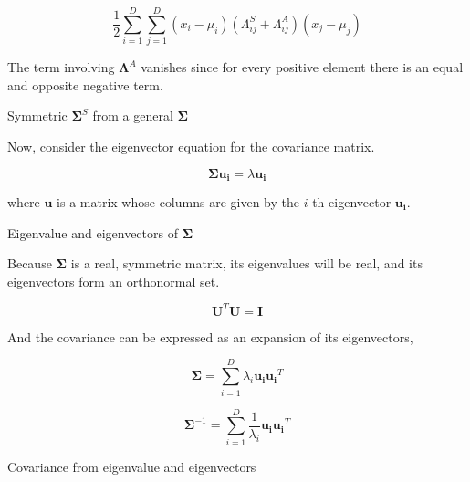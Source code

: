 \begin{equation}
\frac{1}{2} \sum_{i=1}^D \sum_{j=1}^D (x_i - \mu_i) (\Lambda_{ij}^S + \Lambda_{ij}^A)(x_j - \mu_j)
\end{equation}

The term involving $\bm{\Lambda}^A$ vanishes since for every positive element there is an equal and opposite negative term.

\begin{algorithm}  
  \caption{Symmetric $\bm{\Sigma}^S$ from a general $\bm{\Sigma}$}
  \label{alg:symmetricSigma}
  
\end{algorithm}

Now, consider the eigenvector equation for the covariance matrix.

\begin{equation}
 \bm{\Sigma}\mathbf{u_i} = \lambda \mathbf{u_i}
\end{equation}

where $\mathbf{u}$ is a matrix whose columns are given by the $i$-th eigenvector $\mathbf{u_i}$.

\begin{algorithm}  
  \caption{Eigenvalue and eigenvectors of $\bm{\Sigma}$}
  \label{alg:eigenvectorSigma}
  
\end{algorithm}

Because $\bm{\Sigma}$ is a real, symmetric matrix, its eigenvalues will be real, and its eigenvectors form an orthonormal set.

\begin{equation}
 \mathbf{U}^T \mathbf{U} = \mathbf{I}
\end{equation}

And the covariance can be expressed as an expansion of its eigenvectors,

\begin{equation}
 \bm{\Sigma} = \sum_{i=1}^D  \lambda_i \mathbf{u_i} \mathbf{u_i}^T
\end{equation}

\begin{equation}\label{eq:precisionFromEigen}
  \bm{\Sigma}^{-1} = \sum_{i=1}^D  \frac{1}{\lambda_i}\mathbf{u_i} \mathbf{u_i}^T 
\end{equation}


\begin{algorithm}  
  \caption{Covariance from eigenvalue and eigenvectors}
  \label{alg:covarianceEigenvector}
  
\end{algorithm}

